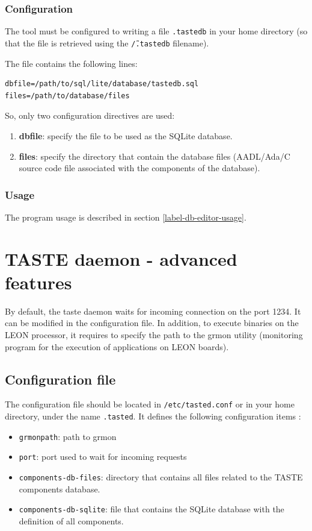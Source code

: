 \documentclass[11pt]{book}
\begin{document}
      \subsection{Configuration}
      \label{db-editor-configuration}
      The tool must be configured to writing a file \texttt{.tastedb} in your
      home directory (so that the file is retrieved using the
      \texttt{\~/.tastedb} filename).

      The file contains the following lines:
      \begin{verbatim}
dbfile=/path/to/sql/lite/database/tastedb.sql
files=/path/to/database/files
      \end{verbatim}

      So, only two configuration directives are used:
      \begin{enumerate}
         \item
            \textbf{dbfile}: specify the file to be used as the SQLite database.
         \item
            \textbf{files}: specify the directory that contain the database
            files (AADL/Ada/C source code file associated with the components
            of the database).
      \end{enumerate}

      \subsection{Usage}
      The program usage is described in section \ref{label-db-editor-usage}.

\chapter{TASTE daemon - advanced features}
\label{chapter-tasted}
By default, the taste daemon waits for incoming connection on the port 1234. It
can be modified in the configuration file. In addition, to execute binaries on
the LEON processor, it requires to specify the path to the grmon utility
(monitoring program for the execution of applications on LEON boards).

   \section{Configuration file}
   The configuration file should be located in \texttt{/etc/tasted.conf} or
   in your home directory, under the name \texttt{.tasted}. It defines the
   following configuration items :
   \begin{itemize}
      \item
         \texttt{grmonpath}: path to grmon
      \item
         \texttt{port}: port used to wait for incoming requests
      \item
         \texttt{components-db-files}: directory that contains all files related
         to the TASTE components database.
      \item
         \texttt{components-db-sqlite}: file that contains the SQLite database
         with the definition of all components.
   \end{itemize}
\end{document}

